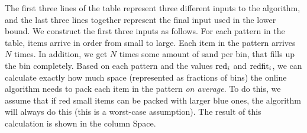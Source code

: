 \begin{table}[t]
	\caption{Inputs for lower bound $1.5762$ in case $\redfit_4=2$.}
	\label{tab:lb_redfit2}
	\centering
\end{table}

The first three lines of the table represent three different inputs to the algorithm, and the last three lines together represent the final input used in the lower bound.
We construct the first three inputs as follows. For each pattern in the table, 
items arrive in order from small to large. Each item in the pattern arrives $N$ times. In addition, we get $N$ times some amount of sand per bin, that fills up the bin completely. 
Based on each pattern and the values $\mathrm{red}_i$ and $\mathrm{redfit}_i$, we can calculate exactly how much space (represented as fractions of bins) the online algorithm needs to pack each item in the pattern \emph{on average}. 
To do this, we assume that if red small items can be packed with larger 
blue ones, the algorithm will always do this (this is a worst-case assumption).
The result of this calculation is shown in the column Space.



